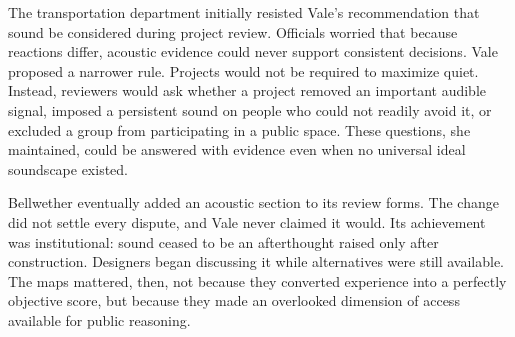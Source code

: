 The transportation department initially resisted Vale's recommendation that sound be considered during project review. Officials worried that because reactions differ, acoustic evidence could never support consistent decisions. Vale proposed a narrower rule. Projects would not be required to maximize quiet. Instead, reviewers would ask whether a project removed an important audible signal, imposed a persistent sound on people who could not readily avoid it, or excluded a group from participating in a public space. These questions, she maintained, could be answered with evidence even when no universal ideal soundscape existed.

Bellwether eventually added an acoustic section to its review forms. The change did not settle every dispute, and Vale never claimed it would. Its achievement was institutional: sound ceased to be an afterthought raised only after construction. Designers began discussing it while alternatives were still available. The maps mattered, then, not because they converted experience into a perfectly objective score, but because they made an overlooked dimension of access available for public reasoning.

